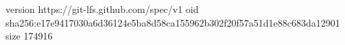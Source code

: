 version https://git-lfs.github.com/spec/v1
oid sha256:e17e9417030a6d36124e5ba8d58ca155962b302f20f57a51d1e88c683da12901
size 174916
